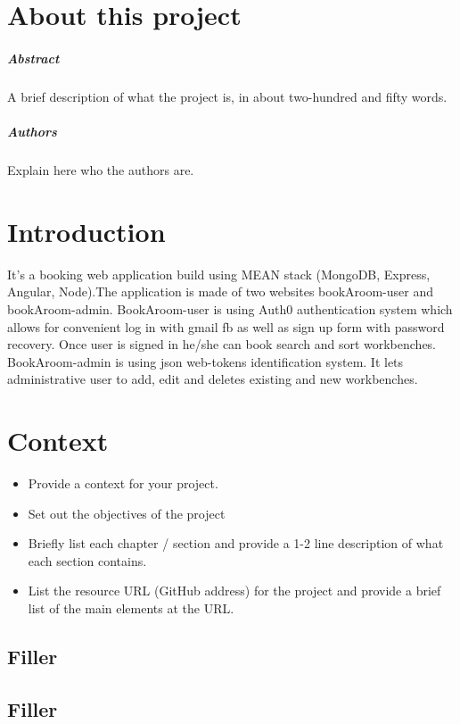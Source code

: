 \chapter*{About this project}
\paragraph{Abstract}
A brief description of what the project is, in about two-hundred and fifty words.

\paragraph{Authors}
Explain here who the authors are.



\chapter{Introduction}
\bigbreak
It’s a booking web application build using MEAN stack (MongoDB, Express, Angular, Node).The application is made of two websites bookAroom-user and bookAroom-admin.
BookAroom-user is using Auth0 authentication system which allows for convenient log in with gmail fb as well as sign up form with password recovery. Once user is signed in he/she can book search and sort workbenches.
BookAroom-admin is using json web-tokens identification system. It lets administrative user to add, edit and deletes existing and new workbenches.

\chapter{Context}
\begin{itemize}
\item Provide a context for your project.
\item Set out the objectives of the project
\item Briefly list each chapter / section and provide a 1-2 line description of what each section contains.
\item List the resource URL (GitHub address) for the project and provide a brief list of the main elements at the URL.
\end{itemize}

\section{Filler}


\section{Filler}


